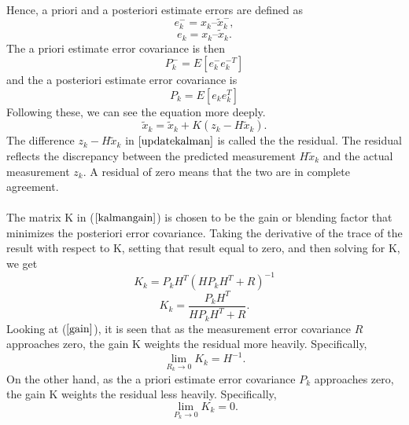 \documentclass[a4paper,10pt]{report}
\begin{document}
\paragraph*{}
Hence, a priori and a posteriori estimate errors are defined as
\begin{equation}
e_k^- = x_k – \tilde x_k^- ,
\end{equation}
\begin{equation}
e_k =  x_k – \tilde x_k.
\end{equation}
The a priori estimate error covariance is then
\begin{equation}
P_k^- = E[ e_k^- e_k^{-T} ]
\end{equation}
and the a posteriori estimate error covariance is
\begin{equation}
P_k = E[e_k e_k^T]
\end{equation}
Following these, we can see the equation more deeply.
\begin{equation}
\tilde x_k = \tilde x_k + K(z_k-H\tilde x_k).
\label{updatekalman}
\end{equation}
The difference $z_k - H\tilde x_k$ in $\ref{updatekalman}$ is called the the residual. The residual reflects the discrepancy between the
predicted measurement $H\tilde x_k$ and the actual measurement $z_k$. A residual of zero means that the two are in complete
agreement. \paragraph*{}
The matrix K in ($\ref{kalmangain}$) is chosen to be the gain or blending factor that minimizes the posteriori error covariance. Taking the derivative of the trace of the result with respect to K, setting that result equal to zero, and then solving for K, we get
\begin{equation}
K_k = P_kH^{T}(HP_kH^{T} + R)^{-1}
\end{equation}
\begin{equation}
K_k = \frac{P_kH^T}{HP_kH^T + R}.
\label{gain}
\end{equation}
Looking at ($\ref{gain}$), it is seen that as the measurement error covariance $R$ approaches zero, the gain K weights the residual more
heavily. Specifically,
\begin{equation}
\mathop {\lim }\limits_{R_k \to 0 } {K_k} = H^{-1}.
\end{equation}
On the other hand, as the a priori estimate error covariance $P_k$ approaches zero, the gain K weights the residual less heavily. Specifically,
\begin{equation}
\mathop {\lim }\limits_{P_k \to 0 } {K_k} = 0.
\end{equation}
\end{document}
